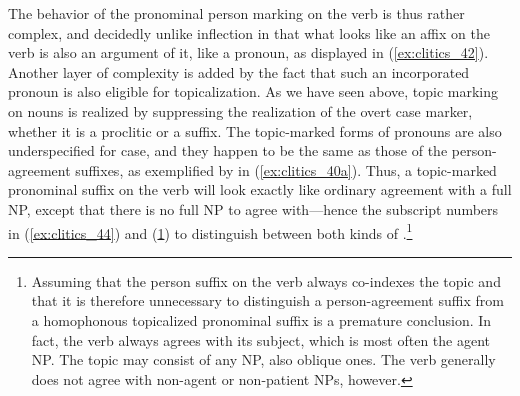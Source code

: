 The behavior of the pronominal person marking on the verb is thus rather
complex, and decidedly unlike inflection in that what looks like an affix on
the verb is also an argument of it, like a pronoun, as displayed in
(\ref{ex:clitics_42}). Another layer of complexity is added by the fact that
such an incorporated pronoun is also eligible for topicalization. As we have
seen above, topic marking on nouns is realized by suppressing the realization
of the overt case marker, whether it is a proclitic or a suffix. The
topic-marked forms of pronouns are also underspecified for case, and they
happen to be the same as those of the person-agreement suffixes, as exemplified
by  in (\ref{ex:clitics_40a}). Thus, a topic-marked pronominal
suffix on the verb will look exactly like ordinary agreement with a full NP,
except that there is no full NP to agree with---hence the subscript numbers in
(\ref{ex:clitics_44}) and (\ref{ex:clitics_45}) to distinguish between both
kinds of .\footnote{Assuming that the person suffix on the verb
always co-indexes the topic and that it is therefore unnecessary to distinguish
a person-agreement suffix from a homophonous topicalized pronominal suffix is a
premature conclusion. In fact, the verb always agrees with its subject, which
is most often the agent NP. The topic may consist of any NP, also oblique ones.
The verb generally does not agree with non-agent or non-patient NPs, however.}

\begin{figure}[h]
\begin{morphlex}
\ex\label{ex:clitics_45}
\xe
\end{morphlex}
\end{figure}

